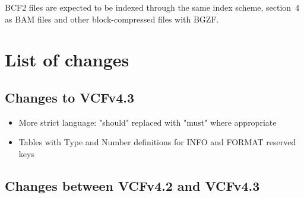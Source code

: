 \documentclass[8pt]{article}
\begin{document}
BCF2 files are expected to be indexed through the same index scheme,
section~4 as BAM files and other block-compressed files with BGZF.

\section{List of changes}

\subsection{Changes to VCFv4.3}

\begin{itemize}
\item More strict language: "should" replaced with "must" where appropriate
\item Tables with Type and Number definitions for INFO and FORMAT reserved keys
\end{itemize}

\subsection{Changes between VCFv4.2 and VCFv4.3}
\end{document}
